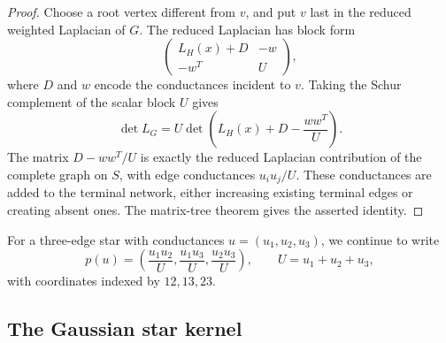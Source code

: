 \documentclass[preprint,12pt,authoryear]{elsarticle}
\numberwithin{equation}{section}
\theoremstyle{definition}
\theoremstyle{remark}
\newcommand{\1}{\mathbf{1}}
\begin{document}
\begin{proof}
Choose a root vertex different from \(v\), and put \(v\) last in the reduced weighted Laplacian of \(G\).  The reduced Laplacian has block form
\begin{equation}
        \begin{pmatrix}
        L_H(x)+D & -w\\
        -w^T & U
        \end{pmatrix},
\end{equation}
where \(D\) and \(w\) encode the conductances incident to \(v\).  Taking the Schur complement of the scalar block \(U\) \cite{HornJohnson2013} gives
\begin{equation}
        \det L_G
        =
        U\det\left(L_H(x)+D-\frac{ww^T}{U}\right).
\end{equation}
The matrix \(D-ww^T/U\) is exactly the reduced Laplacian contribution of the complete graph on \(S\), with edge conductances \(u_i u_j/U\).  These conductances are added to the terminal network, either increasing existing terminal edges or creating absent ones.  The matrix-tree theorem gives the asserted identity.
\end{proof}

For a three-edge star with conductances \(u=(u_1,u_2,u_3)\), we continue to write
\begin{equation}
        p(u)=\left(\frac{u_1u_2}{U},\frac{u_1u_3}{U},\frac{u_2u_3}{U}\right),
        \qquad U=u_1+u_2+u_3,
\end{equation}
with coordinates indexed by \(12,13,23\).

\subsection{The Gaussian star kernel}
\end{document}
